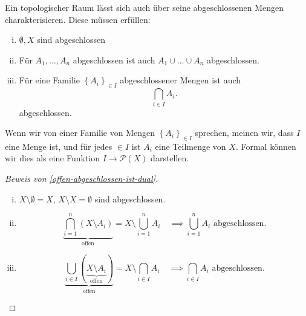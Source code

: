 \begin{theorem}[Dualität]\label{offen-abgeschlossen-ist-dual}
    Ein topologischer Raum lässt sich auch über seine abgeschlossenen Mengen charakterisieren. Diese müssen erfüllen:
    \begin{enumerate}[i)]
        \item $\emptyset,X$ sind abgeschlossen
        \item Für $A_1,\ldots,A_n$ abgeschlossen ist auch $A_1\cup \ldots \cup A_n$ abgeschlossen.
        \item Für eine Familie $\left \{A_i\right\} _{\in I}$ abgeschlossener Mengen ist auch
            \[
            \bigcap_{i\in I} A_i
            .\] 
            abgeschlossen.
    \end{enumerate}
\end{theorem}

\begin{recap}
    Wenn wir von einer Familie von Mengen $\left \{A_i\right\} _{\in I}$ sprechen, meinen wir, dass $I$ eine Menge ist, und für jedes $\in I$ ist $A_i$ eine Teilmenge von  $X$. Formal können wir dies als eine Funktion  $I \to  \mathcal{P}(X)$ darstellen.
\end{recap}
\begin{proof}[Beweis von \autoref{offen-abgeschlossen-ist-dual}]
    \begin{enumerate}[i)]
        \item $X \setminus \emptyset = X$, $X\setminus X = \emptyset$ sind abgeschlossen.
        \item  \[
                \underbrace{\bigcap_{i=1}^n (X\setminus A_i)}_{\text{offen}} = X \setminus  \bigcup_{i=1}^n A_i \quad \implies \bigcup_{i=1}^n A_i \text{ abgeschlossen}
        .\] 
        \item \[
                \underbrace{\bigcup_{i\in I} (\underbrace{X\setminus A_i}_{\text{offen}})}_{\text{offen}} = X \setminus \bigcap_{i \in I} A_i \quad \implies \bigcap_{i \in I} A_i \text{ abgeschlossen}
        .\] 
    \end{enumerate}
\end{proof}


